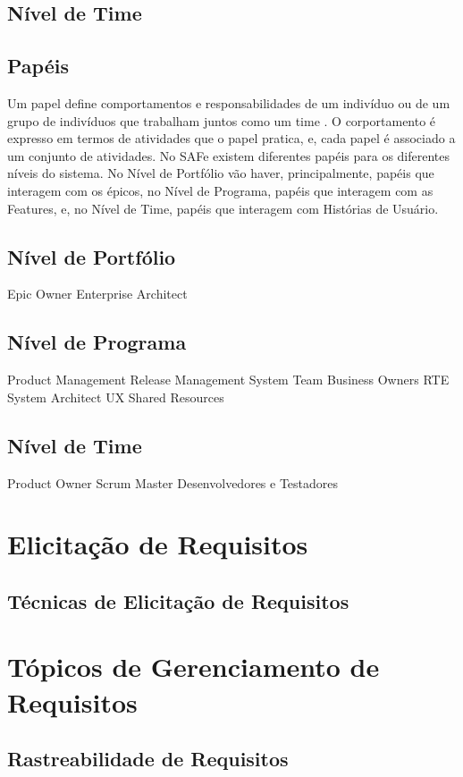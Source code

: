 \section{Nível de Time}

\section{Papéis}
Um papel define comportamentos e responsabilidades de um indivíduo ou de um grupo de indivíduos que trabalham juntos como um time \cite{kruchten002}. O corportamento é expresso em termos de atividades que o papel pratica, e, cada papel é associado a um conjunto de atividades. No SAFe existem diferentes papéis para os diferentes níveis do sistema. No Nível de Portfólio vão haver, principalmente, papéis que interagem com os épicos, no Nível de Programa, papéis que interagem com as Features, e, no Nível de Time, papéis que interagem com Histórias de Usuário.
\section{Nível de Portfólio}
Epic Owner
Enterprise Architect
\section{Nível de Programa}
Product Management
Release Management
System Team
Business Owners
RTE
System Architect
UX
Shared Resources

\section{Nível de Time}
Product Owner
Scrum Master
Desenvolvedores e Testadores

\chapter[Elicitação de Requisitos]{Elicitação de Requisitos}
\section{Técnicas de Elicitação de Requisitos}

\chapter[Tópicos de Gerenciamento de Requisitos]{Tópicos de Gerenciamento de Requisitos}
\section{Rastreabilidade de Requisitos}
